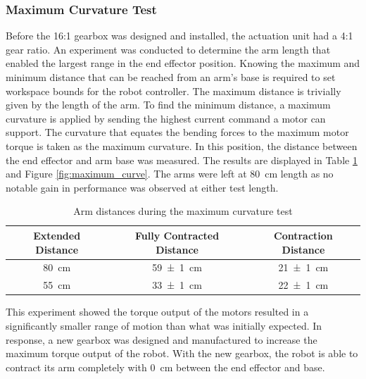 \subsubsection{Maximum Curvature Test}
Before the 16:1 gearbox was designed and installed, the actuation unit had a 4:1 gear ratio. An experiment was conducted to determine the arm length that enabled the largest range in the end effector position. Knowing the maximum and minimum distance that can be reached from an arm's base is required to set workspace bounds for the robot controller. The maximum distance is trivially given by the length of the arm. To find the minimum distance, a maximum curvature is applied by sending the highest current command a motor can support. The curvature that equates the bending forces to the maximum motor torque is taken as the maximum curvature. In this position, the distance between the end effector and arm base was measured. The results are displayed in Table \ref{tab:arm_length} and Figure \ref{fig:maximum_curve}. The arms were left at \SI{80}{cm} length as no notable gain in performance was observed at either test length. 

\begin{table}[h]
    \centering
    \caption{Arm distances during the maximum curvature test}
    \begin{tabular}{c|c|c}
        Extended Distance & Fully Contracted Distance & Contraction Distance \\
        \hline
        \SI{80}{cm} & \SI{59(1)}{cm} & \SI{21(1)}{cm} \\
        \SI{55}{cm} & \SI{33(1)}{cm} & \SI{22(1)}{cm} \\
    \end{tabular}
    \label{tab:arm_length}
\end{table}

This experiment showed the torque output of the motors resulted in a significantly smaller range of motion than what was initially expected. In response, a new gearbox was designed and manufactured to increase the maximum torque output of the robot. With the new gearbox, the robot is able to contract its arm completely with \SI{0}{cm} between the end effector and base. 

